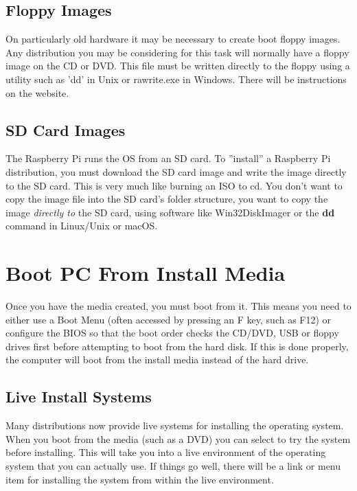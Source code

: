 
\subsection{Floppy Images}

On particularly old hardware it may be necessary to create boot floppy images.  Any distribution you may be considering for this task will normally have a floppy image on the CD or DVD.  This file must be written directly to the floppy using a utility such as 'dd' in Unix or rawrite.exe in Windows.  There will be instructions on the website.

\subsection{SD Card Images}

The Raspberry Pi runs the OS from an SD card.  To ''install'' a Raspberry Pi distribution, you must download the SD card image and write the image directly to the SD card.  This is very much like burning an ISO to cd.  You don't want to copy the image file into the SD card's folder structure, you want to copy the image \textit{directly to} the SD card, using software like Win32DiskImager or the \textbf{dd} command in Linux/Unix or macOS.

\section{Boot PC From Install Media}

Once you have the media created, you must boot from it.  This means you need to either use a Boot Menu (often accessed by pressing an F key, such as F12) or configure the BIOS so that the boot order checks the CD/DVD, USB or floppy drives first before attempting to boot from the hard disk.  If this is done properly, the computer will boot from the install media instead of the hard drive.

\subsection{Live Install Systems}

Many distributions now provide live systems for installing the operating system.  When you boot from the media (such as a DVD) you can select to try the system before installing.  This will take you into a live environment of the operating system that you can actually use.  If things go well, there will be a link or menu item for installing the system from within the live environment.\\

